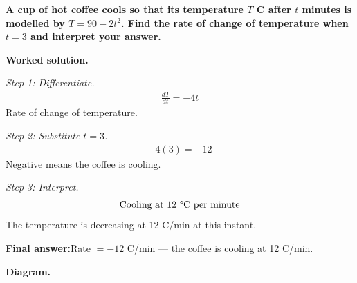 \documentclass[11pt]{article}
\newcommand{\question}[1]{\par\medskip\noindent\textbf{#1}\par}
\begin{document}
\question{A cup of hot coffee cools so that its temperature \( T \) \textdegree C after \( t \) minutes is modelled by \( T = 90 - 2t^2 \). Find the rate of change of temperature when \( t = 3 \) and interpret your answer.}

\textbf{Worked solution.}

\textit{Step 1: Differentiate.}
\[\begin{gathered}
\frac{dT}{dt} = -4t
\end{gathered}\]
Rate of change of temperature.

\textit{Step 2: Substitute \( t = 3 \).}
\[\begin{gathered}
-4(3) = -12
\end{gathered}\]
Negative means the coffee is cooling.

\textit{Step 3: Interpret.}
\[\begin{gathered}
\text{Cooling at } 12 \text{ \textdegree{}C per minute}
\end{gathered}\]
The temperature is decreasing at 12 \textdegree C/min at this instant.

\begin{answerbox}
\textbf{Final answer:}\quad Rate \(\displaystyle  = -12 \) \textdegree C/min --- the coffee is cooling at 12 \textdegree C/min.
\end{answerbox}
\textbf{Diagram.}
\end{document}
